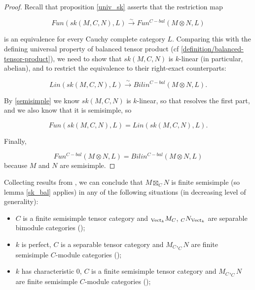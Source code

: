 \begin{proof}
  Recall that proposition \ref{univ_sk} asserts that the restriction map

  \[
   Fun(sk(M,C,N),L) \xrightarrow{\sim} Fun^{C-bal}(M \otimes N,L)
  \]

  is an equivalence for every Cauchy complete category $L$. Comparing this
  with the defining universal property of balanced tensor product
  (cf \ref{definition/balanced-tensor-product}), we need to show that
  $sk(M,C,N)$ is $k$-linear (in particular, abelian), and to restrict the
  equivalence to their right-exact counterparts:

  \[
    Lin(sk(M,C,N),L) \xrightarrow{\sim} Bilin^{C-bal}(M \otimes N, L).
  \]

  By \ref{semisimple} we know $sk(M,C,N)$ is $k$-linear, so that resolves the
  first part, and we also know that it is semisimple, so

  \[
    Fun(sk(M,C,N), L) = Lin(sk(M,C,N), L).
  \]

  Finally,

  \[
    Fun^{C-bal}(M \otimes N, L) = Bilin^{C-bal}(M \otimes N, L)
  \]
  because $M$ and $N$ are semisimple.
\end{proof}

\begin{remark}\label{semisimple_douglas/dualizable-tensor-categories}

  \noindent Collecting results
  from \cite{douglas/dualizable-tensor-categories}, we can conclude that
  $M\boxtimes_C N$ is finite semisimple (so lemma \ref{sk_bal} applies) in any
  of the following situations (in decreasing level of generality):

  \begin{itemize}

    \item $C$ is a finite semisimple tensor category and $_{\operatorname{Vect}_k}M_C$,
    $_{C}N_{\operatorname{Vect}_k}$ are separable bimodule categories (\cite[proposition
    2.5.3, theorem 2.5.5]{douglas/dualizable-tensor-categories});

    \item $k$ is perfect, $C$ is a separable tensor category and $M_C,_{C}N$ 
    are finite semisimple $C$-module categories (\cite[proposition
    2.5.10]{douglas/dualizable-tensor-categories});

    \item $k$ has characteristic $0$, $C$ is a finite semisimple tensor category 
    and $M_C,_{C}N$ are finite semisimple $C$-module categories
    (\cite[Corollary 2.6.9]{douglas/dualizable-tensor-categories});

  \end{itemize}
\end{remark}

